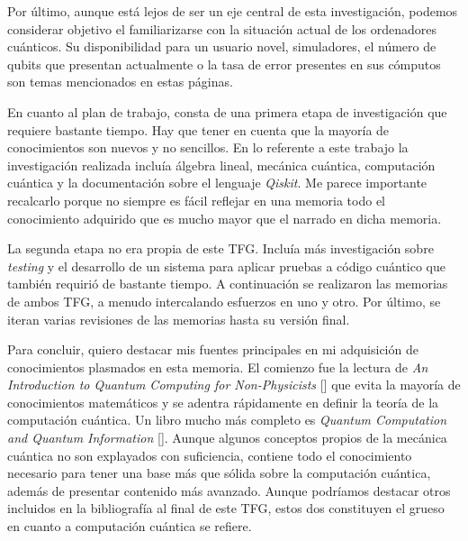 Por último, aunque está lejos de ser un eje central de esta investigación, podemos considerar objetivo el familiarizarse con la situación actual de los ordenadores cuánticos. Su disponibilidad para un usuario novel, simuladores, el número de qubits que presentan actualmente o la tasa de error presentes en sus cómputos son temas mencionados en estas páginas.

En cuanto al plan de trabajo, consta de una primera etapa de investigación que requiere bastante tiempo. Hay que tener en cuenta que la mayoría de conocimientos son nuevos y no sencillos. En lo referente a este trabajo la investigación realizada incluía álgebra lineal, mecánica cuántica, computación cuántica y la documentación sobre el lenguaje \textit{Qiskit}. Me parece importante recalcarlo porque no siempre es fácil reflejar en una memoria todo el conocimiento adquirido que es mucho mayor que el narrado en dicha memoria.

La segunda etapa no era propia de este TFG. Incluía más investigación sobre \textit{testing} y el desarrollo de un sistema para aplicar pruebas a código cuántico que también requirió de bastante tiempo. A continuación se realizaron las memorias de ambos TFG, a menudo intercalando esfuerzos en uno y otro. Por último, se iteran varias revisiones de las memorias hasta su versión final.

Para concluir, quiero destacar mis fuentes principales en mi adquisición de conocimientos plasmados en esta memoria. El comienzo fue la lectura de \textit{An Introduction to Quantum Computing for Non-Physicists} [\cite{rieffel2000introduction}] que evita la mayoría de conocimientos matemáticos y se adentra rápidamente en definir la teoría de la computación cuántica. Un libro mucho más completo es \textit{Quantum Computation and Quantum Information} [\cite{nielsen2001quantum}]. Aunque algunos conceptos propios de la mecánica cuántica no son explayados con suficiencia, contiene todo el conocimiento necesario para tener una base más que sólida sobre la computación cuántica, además de presentar contenido más avanzado. Aunque podríamos destacar otros incluidos en la bibliografía al final de este TFG, estos dos constituyen el grueso en cuanto a computación cuántica se refiere.